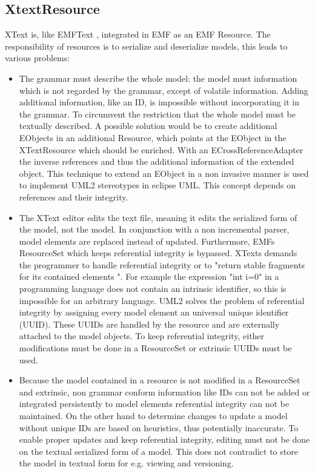 \subsection{XtextResource}
XText is, like EMFText \cite{EMFTextMan}, integrated in EMF as an EMF Resource. The responsibility of resources is to serialize and deserialize models, this leads to various problems: 

\begin{itemize}
	\item The grammar must describe the whole model: the model must information which is not regarded by the grammar, except of volatile information. Adding additional information, like an ID, is impossible without incorporating it in the grammar. To circumvent the restriction that the whole model must be textually described. A possible solution would be to create additional EObjects in an additional Resource, which points at the EObject in the XTextResource which should be enriched. With an ECrossReferenceAdapter the inverse references and thus the additional information of the extended object. This technique to extend an EObject in a non invasive manner is used to implement UML2 stereotypes in eclipse UML. This concept depends on references and their integrity.
	\item The XText editor edits the text file, meaning it edits the serialized form of the model, not the model. In conjunction with a non incremental parser, model elements are replaced instead of updated. Furthermore, EMFs ResourceSet which keeps referential integrity is bypassed. XTexts demands the programmer to handle referential integrity or to "return stable fragments for its contained elements ". For example the expression "int i=0" in a programming language does not contain an intrinsic identifier, so this is impossible for an arbitrary language. UML2 solves the problem of referential integrity by assigning every model element an universal unique identifier (UUID). These UUIDs are handled by the resource and are  externally attached to the model objects. To keep referential integrity, either modifications must be done in a ResourceSet or extrinsic UUIDs must be used. 
	\item Because the model contained in a resource is  not modified in a ResourceSet and extrinsic, non grammar conform information like IDs can not be added or integrated persistently to model elements referential integrity can not be maintained. On the other hand to determine changes to update a model without unique IDs are based on heuristics, thus potentially inaccurate.  To enable proper updates and keep referential integrity, editing must not be done on the textual serialized form of a model. This does not contradict to store the model in textual form for e.g. viewing and versioning. 
\end{itemize}

